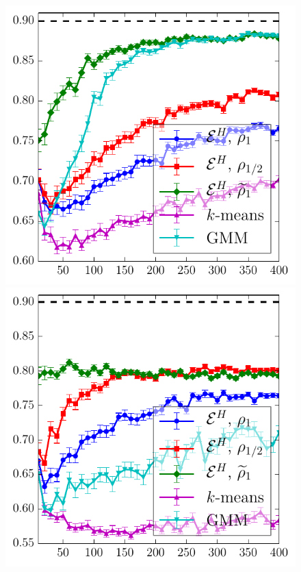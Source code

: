 \documentclass[twoside]{article}
\begin{document}
\begin{figure}[t]
\includegraphics[scale=.41]{normal_kernels.pdf}
\includegraphics[scale=.41]{lognormal_kernels.pdf}\\

\end{figure}
\end{document}

